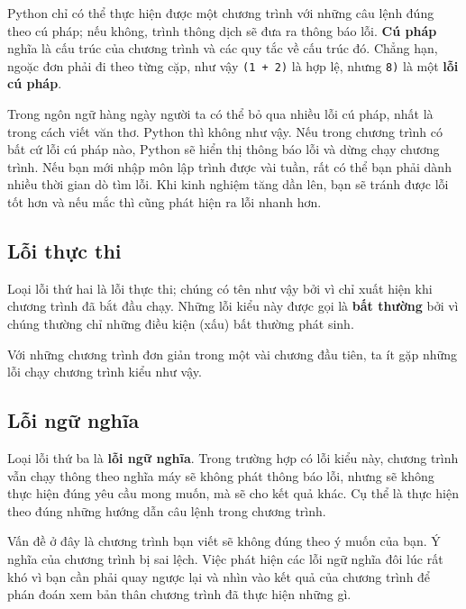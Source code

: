 \documentclass[11pt]{book}
\begin{document}
Python chỉ có thể thực hiện được một chương trình với những câu lệnh
đúng theo cú pháp; nếu không, trình thông dịch sẽ đưa ra thông báo
lỗi. {\bf Cú pháp} nghĩa là cấu trúc của chương trình và các quy tắc về
cấu trúc đó.  
Chẳng hạn, ngoặc đơn phải đi theo từng cặp, như vậy
{\tt (1 + 2)} là hợp lệ, nhưng {\tt 8)} là một {\bf lỗi cú pháp}.


Trong ngôn ngữ hàng ngày người ta có thể bỏ qua nhiều lỗi cú pháp,
nhất là trong cách viết văn thơ. Python thì không như vậy. Nếu trong
chương trình có bất cứ lỗi cú pháp nào, Python sẽ hiển thị thông
báo lỗi và dừng chạy chương trình. Nếu bạn mới nhập môn lập trình
được vài tuần, rất có thể bạn phải dành nhiều thời gian dò tìm lỗi. Khi
kinh nghiệm tăng dần lên, bạn sẽ tránh được lỗi tốt hơn và nếu mắc
thì cũng phát hiện ra lỗi nhanh hơn.


\subsection{Lỗi thực thi}

Loại lỗi thứ hai là lỗi thực thi; chúng có tên như vậy bởi vì
chỉ xuất hiện khi chương trình đã bắt đầu chạy. Những lỗi kiểu này
được gọi là \textbf{bất thường} bởi vì chúng thường chỉ những điều 
kiện (xấu) bất thường phát sinh.

Với những chương trình đơn giản trong một vài chương đầu tiên, ta 
ít gặp những lỗi chạy chương trình kiểu như vậy.

\subsection{Lỗi ngữ nghĩa}

Loại lỗi thứ ba là \textbf{lỗi ngữ nghĩa}. Trong trường hợp có lỗi
kiểu này, chương trình vẫn chạy thông theo nghĩa máy sẽ không
phát thông báo lỗi, nhưng sẽ không thực hiện đúng yêu cầu
mong muốn, mà sẽ cho kết quả khác. Cụ thể là thực hiện theo
đúng những hướng dẫn câu lệnh trong chương trình.

Vấn đề ở đây là chương trình bạn viết sẽ không đúng theo ý muốn
của bạn. Ý nghĩa của chương trình bị sai lệch. Việc phát hiện các lỗi
ngữ nghĩa đôi lúc rất khó vì bạn cần phải quay ngược lại và nhìn vào
kết quả của chương trình để phán đoán xem bản thân chương trình
đã thực hiện những gì.
\end{document}
